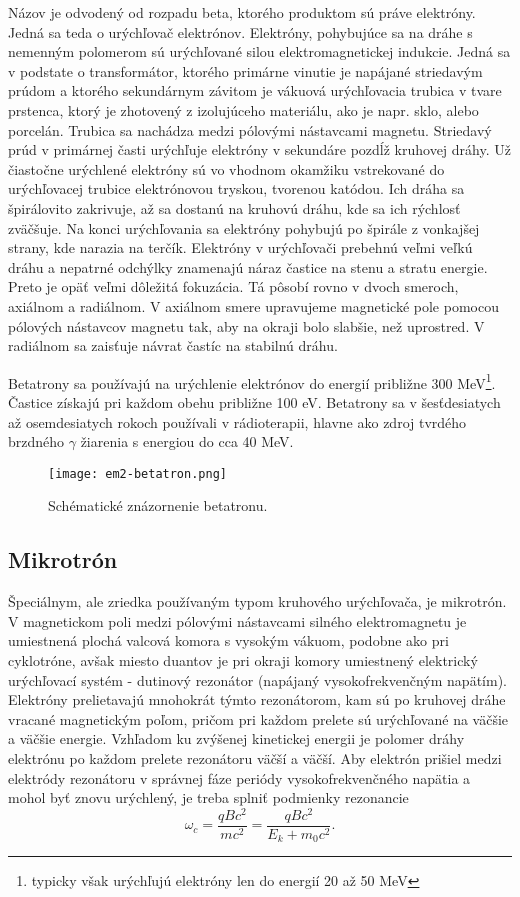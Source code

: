 \documentclass[../../main.tex]{subfiles}
\begin{document}
Názov je odvodený od rozpadu beta, ktorého produktom sú práve elektróny. Jedná sa teda o urýchľovač elektrónov. Elektróny, pohybujúce sa na dráhe s nemenným polomerom sú urýchľované silou elektromagnetickej indukcie. Jedná sa v podstate o transformátor, ktorého primárne vinutie je napájané striedavým prúdom a ktorého sekundárnym závitom je vákuová urýchľovacia trubica v tvare prstenca, ktorý je zhotovený z izolujúceho materiálu, ako je napr. sklo, alebo porcelán. Trubica sa nachádza medzi pólovými nástavcami magnetu. Striedavý prúd v primárnej časti urýchľuje elektróny v sekundáre pozdĺž kruhovej dráhy. Už čiastočne urýchlené elektróny sú vo vhodnom okamžiku vstrekované do urýchľovacej trubice elektrónovou tryskou, tvorenou katódou. Ich dráha sa špirálovito zakrivuje, až sa dostanú na kruhovú dráhu, kde sa ich rýchlosť zväčšuje. Na konci urýchľovania sa elektróny pohybujú po špirále z vonkajšej strany, kde narazia na terčík. Elektróny v urýchľovači prebehnú veľmi veľkú dráhu a nepatrné odchýlky znamenajú náraz častice na stenu a stratu energie. Preto je opäť veľmi dôležitá fokuzácia. Tá pôsobí rovno v dvoch smeroch, axiálnom a radiálnom. V axiálnom smere upravujeme magnetické pole pomocou pólových nástavcov magnetu tak, aby na okraji bolo slabšie, než uprostred. V radiálnom sa zaisťuje návrat častíc na stabilnú dráhu.  

Betatrony sa používajú na urýchlenie elektrónov do energií približne 300 MeV\footnote{typicky však urýchľujú elektróny len do energií 20 až 50 MeV}. Častice získajú pri každom obehu približne 100 eV. Betatrony sa v šesťdesiatych až osemdesiatych rokoch používali v rádioterapii, hlavne ako zdroj tvrdého brzdného $\gamma$ žiarenia s energiou do cca 40 MeV.

\begin{figure}[h]
\centering
\texttt{[image: em2-betatron.png]}
\caption{Schématické znázornenie betatronu.}
\label{em2:img:betatron}
\end{figure}


\subsection{Mikrotrón}

Špeciálnym, ale zriedka používaným typom kruhového urýchľovača, je mikrotrón. V magnetickom poli medzi pólovými nástavcami silného elektromagnetu je umiestnená plochá valcová komora s vysokým vákuom, podobne ako pri cyklotróne, avšak miesto duantov je pri okraji komory umiestnený elektrický urýchľovací systém - dutinový rezonátor (napájaný vysokofrekvenčným napätím). Elektróny prelietavajú mnohokrát týmto rezonátorom, kam sú po kruhovej dráhe vracané magnetickým poľom, pričom pri každom prelete sú urýchľované na väčšie a väčšie energie. Vzhľadom ku zvýšenej kinetickej energii je polomer dráhy elektrónu po každom prelete rezonátoru väčší a väčší. Aby elektrón prišiel medzi elektródy rezonátoru v správnej fáze periódy vysokofrekvenčného napätia a mohol byť znovu urýchlený, je treba splniť podmienky rezonancie
\begin{equation}
\omega_c=\dfrac{qBc^2}{mc^2}=\dfrac{qBc^2}{E_k+m_0c^2}.
\end{equation}
\end{document}
